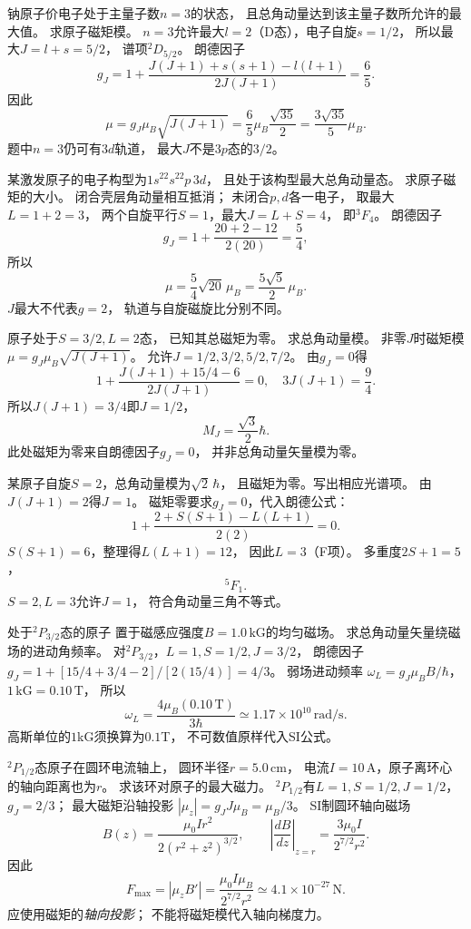 钠原子价电子处于主量子数$n=3$的状态，
且总角动量达到该主量子数所允许的最大值。
求原子磁矩模。
\exsolution
$n=3$允许最大$l=2$（D态），电子自旋$s=1/2$，
所以最大$J=l+s=5/2$，
谱项\({}^{2}D_{5/2}\)。
朗德因子
\[
 g_J=1+\frac{J(J+1)+s(s+1)-l(l+1)}
 {2J(J+1)}
 =\frac65.
\]
因此
\[
 \boxed{\mu=g_J\mu_B\sqrt{J(J+1)}
 =\frac65\mu_B\frac{\sqrt{35}}2
 =\frac{3\sqrt{35}}5\mu_B}.
\]
\excheck 题中$n=3$仍可有$3d$轨道，
最大$J$不是$3p$态的$3/2$。

某激发原子的电子构型为$1s^22s^22p\,3d$，
且处于该构型最大总角动量态。
求原子磁矩的大小。
\exsolution
闭合壳层角动量相互抵消；
未闭合$p,d$各一电子，
取最大$L=1+2=3$，
两个自旋平行$S=1$，最大$J=L+S=4$，
即\({}^{3}F_4\)。
朗德因子
\[
 g_J=1+\frac{20+2-12}{2(20)}=\frac54,
\]
所以
\[
 \boxed{\mu=\frac54\sqrt{20}\,\mu_B
 =\frac{5\sqrt5}2\,\mu_B}.
\]
\excheck $J$最大不代表$g=2$，
轨道与自旋磁旋比分别不同。

原子处于$S=3/2,L=2$态，
已知其总磁矩为零。
求总角动量模。
\exsolution
非零$J$时磁矩模
$\mu=g_J\mu_B\sqrt{J(J+1)}$。
允许$J=1/2,3/2,5/2,7/2$。
由$g_J=0$得
\[
 1+\frac{J(J+1)+15/4-6}{2J(J+1)}=0,
\quad3J(J+1)=\frac94.
\]
所以$J(J+1)=3/4$即$J=1/2$，
\[
 \boxed{M_J=\frac{\sqrt3}2\hbar}.
\]
\excheck 此处磁矩为零来自朗德因子$g_J=0$，
并非总角动量矢量模为零。

某原子自旋$S=2$，总角动量模为$\sqrt2\,\hbar$，
且磁矩为零。写出相应光谱项。
\exsolution
由$J(J+1)=2$得$J=1$。
磁矩零要求$g_J=0$，代入朗德公式：
\[
 1+\frac{2+S(S+1)-L(L+1)}{2(2)}=0.
\]
$S(S+1)=6$，整理得$L(L+1)=12$，
因此$L=3$（F项）。
多重度$2S+1=5$，
\[
 \boxed{{}^{5}F_1}.
\]
\excheck $S=2,L=3$允许$J=1$，
符合角动量三角不等式。

处于\({}^{2}P_{3/2}\)态的原子
置于磁感应强度$B=1.0\,\mathrm{kG}$的均匀磁场。
求总角动量矢量绕磁场的进动角频率。
\exsolution
对\({}^{2}P_{3/2}\)，$L=1,S=1/2,J=3/2$，
朗德因子
$g_J=1+[15/4+3/4-2]/[2(15/4)]=4/3$。
弱场进动频率
$\omega_L=g_J\mu_B B/\hbar$，
$1\,\mathrm{kG}=0.10\,\mathrm T$，
所以
\[
 \boxed{\omega_L=
 \frac{4\mu_B(0.10\,\mathrm T)}{3\hbar}
 \simeq1.17\times10^{10}\,\mathrm{rad/s}}.
\]
\excheck 高斯单位的$1$kG须换算为$0.1$T，
不可数值原样代入SI公式。

\({}^{2}P_{1/2}\)态原子在圆环电流轴上，
圆环半径$r=5.0\,\mathrm{cm}$，
电流$I=10\,\mathrm A$，原子离环心的轴向距离也为$r$。
求该环对原子的最大磁力。
\exsolution
\({}^{2}P_{1/2}\)有$L=1,S=1/2,J=1/2$，
$g_J=2/3$；
最大磁矩沿轴投影
$|\mu_z|=g_JJ\mu_B=\mu_B/3$。
SI制圆环轴向磁场
\[
 B(z)=\frac{\mu_0Ir^2}{2(r^2+z^2)^{3/2}},
 \qquad
 \left|\frac{dB}{dz}\right|_{z=r}
 =\frac{3\mu_0I}{2^{7/2}r^2}.
\]
因此
\[
 \boxed{F_{\max}=|\mu_z B'|
 =\frac{\mu_0I\mu_B}{2^{7/2}r^2}
 \simeq4.1\times10^{-27}\,\mathrm N}.
\]
\excheck 应使用磁矩的\emph{轴向投影}；
不能将磁矩模代入轴向梯度力。

